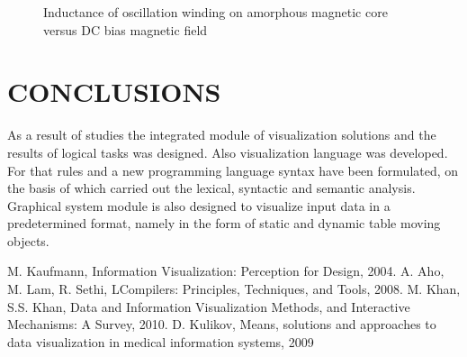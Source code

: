 \documentclass[a4paper, 10pt, conference]{ieeeconf}
\begin{document}
   \begin{figure}[thpb]
      \centering
      \caption{Inductance of oscillation winding on amorphous
       magnetic core versus DC bias magnetic field}
      \label{figurelabel}
   \end{figure}
   

\section{CONCLUSIONS}

As a result of studies the integrated module of visualization solutions and the results of logical tasks was designed. Also visualization language was developed. For that rules and  a new programming language syntax  have been formulated, on the basis of which carried out the lexical, syntactic and semantic analysis. Graphical system module is also designed to visualize input data in a predetermined format, namely in the form of static and dynamic table moving objects.   

\addtolength{\textheight}{-12cm}   %




\begin{thebibliography}{99}

 M. Kaufmann, Information Visualization: Perception for Design, 2004.
 A. Aho, M. Lam, R. Sethi, LCompilers: Principles, Techniques, and Tools, 2008.
 M. Khan, S.S. Khan, Data and Information Visualization Methods, and
Interactive Mechanisms: A Survey, 2010.
 D. Kulikov, Means, solutions and approaches to data visualization in medical information systems, 2009

\end{thebibliography}
\end{document}
